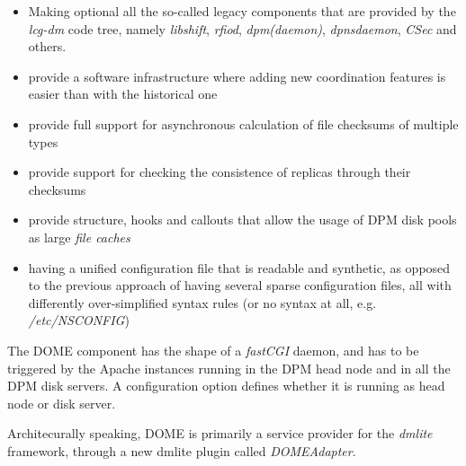 \documentclass[a4paper]{jpconf}
\begin{document}
\begin{itemize}
 \item Making optional all the so-called legacy components that are provided by the \textit{lcg-dm} code tree, namely \textit{libshift}, \textit{rfiod},
 \textit{dpm(daemon)}, \textit{dpnsdaemon}, \textit{CSec} and others.
 \item provide a software infrastructure where adding new coordination features is easier than with the historical one
 \item provide full support for asynchronous calculation of file checksums of multiple types
 \item provide support for checking the consistence of replicas through their checksums
 \item provide structure, hooks and callouts that allow the usage of DPM disk pools as large \textit{file caches}
 \item having a unified configuration file that is readable and synthetic, as opposed to the previous approach of having several
 sparse configuration files, all with differently over-simplified syntax rules (or no syntax at all, e.g. \textit{/etc/NSCONFIG})
\end{itemize}

The DOME component has the shape of a \textit{fastCGI} daemon, and has to be triggered by the Apache instances running in the DPM head node and
in all the DPM disk servers. A configuration option defines whether it is running as head node or disk server.

Architecurally speaking, DOME is primarily a service provider for the \textit{dmlite} framework, through a new dmlite plugin called \textit{DOMEAdapter}.\\
\end{document}

